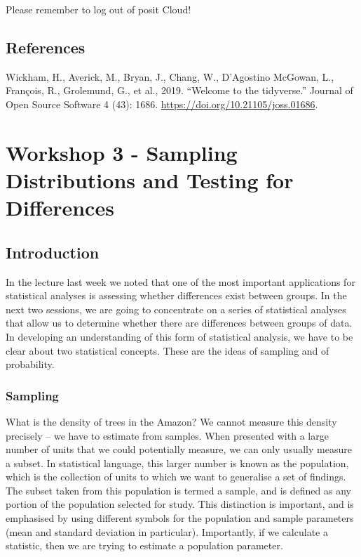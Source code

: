 \documentclass[
]{book}
\begin{document}
Please remember to log out of posit Cloud!

\section{References}\label{references-1}

Wickham, H., Averick, M., Bryan, J., Chang, W., D'Agostino McGowan, L., François, R., Grolemund, G., et al., 2019. ``Welcome to the tidyverse.'' Journal of Open Source Software 4 (43): 1686. \url{https://doi.org/10.21105/joss.01686}.

\chapter{Workshop 3 - Sampling Distributions and Testing for Differences}\label{workshop-3---sampling-distributions-and-testing-for-differences}

\section{Introduction}\label{introduction-2}

In the lecture last week we noted that one of the most important applications for statistical analyses is assessing whether differences exist between groups. In the next two sessions, we are going to concentrate on a series of statistical analyses that allow us to determine whether there are differences between groups of data.
In developing an understanding of this form of statistical analysis, we have to be clear about two statistical concepts. These are the ideas of sampling and of probability.

\subsection*{Sampling}\label{sampling}

What is the density of trees in the Amazon? We cannot measure this density precisely -- we have to estimate from samples. When presented with a large number of units that we could potentially measure, we can only usually measure a subset. In statistical language, this larger number is known as the population, which is the collection of units to which we want to generalise a set of findings. The subset taken from this population is termed a sample, and is defined as any portion of the population selected for study. This distinction is important, and is emphasised by using different symbols for the population and sample parameters (mean and standard deviation in particular). Importantly, if we calculate a statistic, then we are trying to estimate a population parameter.
\end{document}
